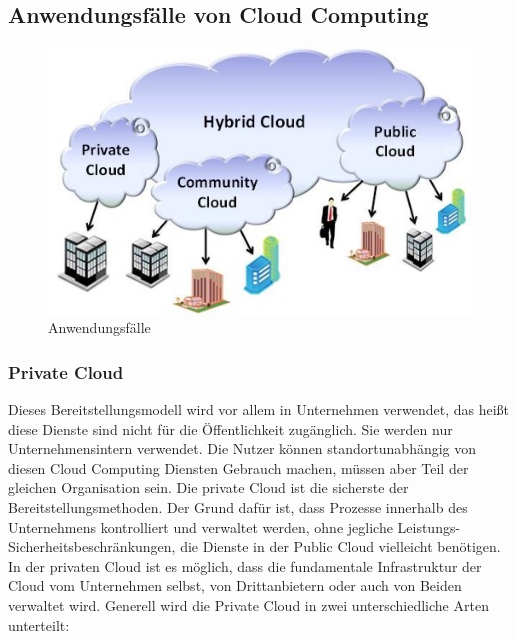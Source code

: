 \subsection{Anwendungsfälle von Cloud Computing}

\begin{figure}[h]
    \centering
    \includegraphics[scale=1]{sections/cloud-computing/images/cc-use-cases.png}
    \caption{Anwendungsfälle}
    \label{fig:kimldl-comparison}
\end{figure}

\subsubsection{Private Cloud}

Dieses Bereitstellungsmodell wird vor allem in Unternehmen verwendet, das heißt diese Dienste sind nicht für die Öffentlichkeit zugänglich. Sie werden nur Unternehmensintern verwendet. Die Nutzer können standortunabhängig von diesen Cloud Computing Diensten Gebrauch machen, müssen aber Teil der gleichen Organisation sein. Die private Cloud ist die sicherste der Bereitstellungsmethoden. Der Grund dafür ist, dass Prozesse innerhalb des Unternehmens kontrolliert und verwaltet werden, ohne jegliche Leistungs- Sicherheitsbeschränkungen, die Dienste in der Public Cloud vielleicht benötigen. In der privaten Cloud ist es möglich, dass die fundamentale Infrastruktur der Cloud vom Unternehmen selbst, von Drittanbietern oder auch von Beiden verwaltet wird. Generell wird die Private Cloud in zwei unterschiedliche Arten unterteilt:

